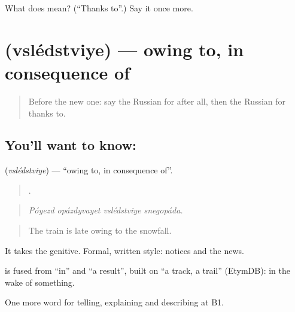 \begin{tcolorbox}[breakable,colback=teal!4,colframe=teal!35!black,title={Before you move on}]
What does  mean? (\textquotedblleft{}Thanks to\textquotedblright{}.) Say it once more.
\end{tcolorbox}
\section[\texorpdfstring{\ru{вследствие} (vslédstviye)}{вследствие (vslédstviye)}]{ (vslédstviye) — owing to, in consequence of}

\label{lesson:RU-C351-vsledstvie}



\begin{quote}
Before the new one: say the Russian for after all, then the Russian for thanks to.
\end{quote}

\subsection*{You'll want to know: }
\textbf{} (\emph{vslédstviye}) — \textquotedblleft{}owing to, in consequence of\textquotedblright{}.

\begin{quote}
   .
\end{quote}

\begin{quote}
\emph{Póyezd opázdyvayet vslédstviye snegopáda.}
\end{quote}

\begin{quote}
The train is late owing to the snowfall.
\end{quote}

It takes the genitive. Formal, written style: notices and the news.

\begin{cousinweb}
\textbf{} is fused from \emph{} \textquotedblleft{}in\textquotedblright{} and \emph{} \textquotedblleft{}a result\textquotedblright{}, built on \emph{} \textquotedblleft{}a track, a trail\textquotedblright{} (EtymDB): in the wake of something.
\end{cousinweb}

\begin{grammarlens}[title={What you've built}]
One more word for telling, explaining and describing at B1.
\end{grammarlens}

